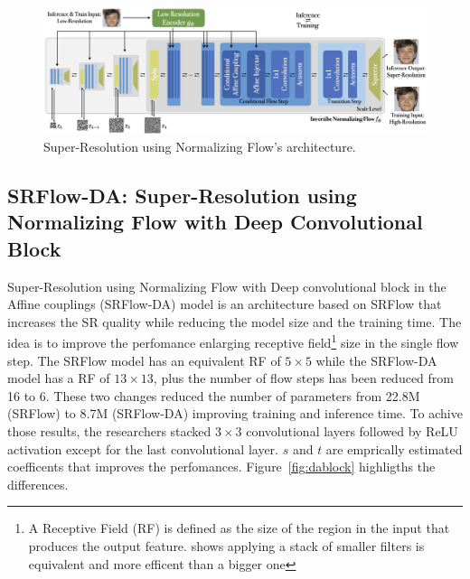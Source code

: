 \documentclass{article}
\begin{document}
\begin{figure}[h]
    \centering
    \includegraphics[scale=.38]{model}
    \caption{Super-Resolution using Normalizing Flow's architecture.}
    \label{img:model}
\end{figure}



\subsection{SRFlow-DA: Super-Resolution using Normalizing Flow with Deep Convolutional Block}
Super-Resolution using Normalizing Flow with Deep convolutional block in the Affine couplings (SRFlow-DA) \cite{srFlow-da} model is an architecture based on SRFlow that increases the SR quality while reducing the model size and the training time. The idea is to improve the perfomance enlarging receptive field\footnote{A Receptive Field (RF) is defined as the size of the region in the input that produces the output feature. \cite{rec} shows applying a stack of smaller filters is equivalent and more efficent than a bigger one} size in the single flow step. The SRFlow model has an equivalent RF of $5 \times 5$ while the SRFlow-DA model has a RF of $13 \times 13$, plus the number of flow steps has been reduced from 16 to 6. These two changes reduced the number of parameters from 22.8M (SRFlow) to 8.7M (SRFlow-DA) improving training and inference time. To achive those results, the researchers stacked $3 \times 3$ convolutional layers followed by ReLU activation except for the last convolutional layer. $s$ and $t$ are emprically estimated coefficents that improves the perfomances. Figure~\ref{fig:dablock} highligths the differences.
\end{document}
